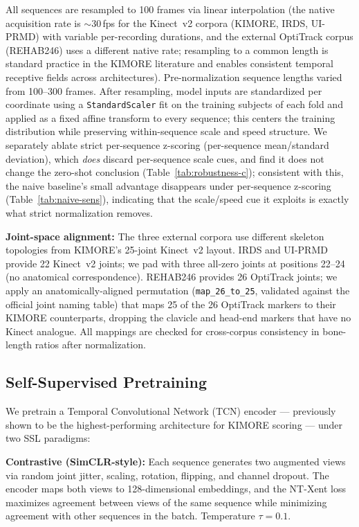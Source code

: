 \documentclass[10pt,journal]{IEEEtran}
\begin{document}
All sequences are resampled to 100 frames via linear interpolation (the native acquisition rate is $\sim$30\,fps for the Kinect~v2 corpora (KIMORE, IRDS, UI-PRMD) with variable per-recording durations, and the external OptiTrack corpus (REHAB246) uses a different native rate; resampling to a common length is standard practice in the KIMORE literature \cite{karlov2024,abedi2023} and enables consistent temporal receptive fields across architectures). Pre-normalization sequence lengths varied from 100--300 frames. After resampling, model inputs are standardized per coordinate using a \texttt{StandardScaler} fit on the training subjects of each fold and applied as a fixed affine transform to every sequence; this centers the training distribution while preserving within-sequence scale and speed structure. We separately ablate strict per-sequence z-scoring (per-sequence mean/standard deviation), which \emph{does} discard per-sequence scale cues, and find it does not change the zero-shot conclusion (Table~\ref{tab:robustness-c}); consistent with this, the naive baseline's small advantage disappears under per-sequence z-scoring (Table~\ref{tab:naive-sens}), indicating that the scale/speed cue it exploits is exactly what strict normalization removes.

\textbf{Joint-space alignment:} The three external corpora use different skeleton topologies from KIMORE's 25-joint Kinect~v2 layout. IRDS and UI-PRMD provide 22 Kinect~v2 joints; we pad with three all-zero joints at positions 22--24 (no anatomical correspondence). REHAB246 provides 26 OptiTrack joints; we apply an anatomically-aligned permutation (\texttt{map\_26\_to\_25}, validated against the official joint naming table) that maps 25 of the 26 OptiTrack markers to their KIMORE counterparts, dropping the clavicle and head-end markers that have no Kinect analogue. All mappings are checked for cross-corpus consistency in bone-length ratios after normalization.

\subsection{Self-Supervised Pretraining}
\label{sec:pretraining}

We pretrain a Temporal Convolutional Network (TCN) encoder \cite{bai2018tcn} --- previously shown to be the highest-performing architecture for KIMORE scoring --- under two SSL paradigms:

\textbf{Contrastive (SimCLR-style):} Each sequence generates two augmented views via random joint jitter, scaling, rotation, flipping, and channel dropout. The encoder maps both views to 128-dimensional embeddings, and the NT-Xent loss \cite{chen2020simclr} maximizes agreement between views of the same sequence while minimizing agreement with other sequences in the batch. Temperature $\tau = 0.1$.
\end{document}
